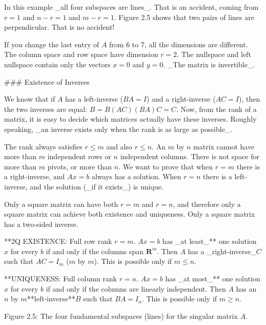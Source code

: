 In this example _all four subspaces are lines_. That is an accident, coming from \(r=1\) and \(n-r=1\) and \(m-r=1\). Figure 2.5 shows that two pairs of lines are perpendicular. That is no accident!

If you change the last entry of \(A\) from 6 to 7, all the dimensions are different. The column space and row space have dimension \(r=2\). The nullspace and left nullspace contain only the vectors \(x=0\) and \(y=0\). _The matrix is invertible_.

### Existence of Inverses

We know that if \(A\) has a left-inverse (\(BA=I\)) and a right-inverse (\(AC=I\)), then the two inverses are equal: \(B=B(AC)(BA)C=C\). Now, from the rank of a matrix, it is easy to decide which matrices actually have these inverses. Roughly speaking, _an inverse exists only when the rank is as large as possible_.

The rank always satisfies \(r\leq m\) and also \(r\leq n\). An \(m\) by \(n\) matrix cannot have more than \(m\) independent rows or \(n\) independent columns. There is not space for more than \(m\) pivots, or more than \(n\). We want to prove that when \(r=m\) there is a right-inverse, and \(Ax=b\) always has a solution. When \(r=n\) there is a left-inverse, and the solution (_if it exists_) is unique.

Only a square matrix can have both \(r=m\) and \(r=n\), and therefore only a square matrix can achieve both existence and uniqueness. Only a square matrix has a two-sided inverse.

**2Q EXISTENCE: Full row rank \(r=m\). \(Ax=b\) has _at least_** one solution \(x\) for every \(b\) if and only if the columns span \(\mathbf{R}^{m}\). Then \(A\) has a _right-inverse_\(C\) such that \(AC=I_{m}\) (\(m\) by \(m\)). This is possible only if \(m\leq n\).

**UNIQUENESS: Full column rank \(r=n\). \(Ax=b\) has _at most_** one solution \(x\) for every \(b\) if and only if the columns are linearly independent. Then \(A\) has an \(n\) by \(m\)**left-inverse**\(B\) such that \(BA=I_{n}\). This is possible only if \(m\geq n\).

Figure 2.5: The four fundamental subspaces (lines) for the singular matrix \(A\).

 